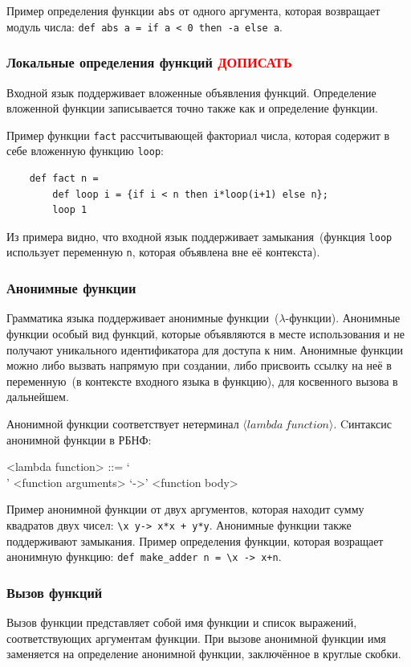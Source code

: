 \documentclass[12pt,a4paper,oneside]{extarticle}
\begin{document}
            Пример определения функции \lstinline$abs$ от одного аргумента, которая возвращает модуль числа: \lstinline$def abs a = if a < 0 then -a else a$.
        \subsubsection{Локальные определения функций \textcolor{red}{ДОПИСАТЬ}}
            Входной язык поддерживает вложенные объявления функций.
            Определение вложенной функции записывается точно также как и определение функции. 

            Пример функции \lstinline$fact$ рассчитывающей факториал числа, которая содержит в себе вложенную функцию \lstinline$loop$:
            \begin{lstlisting}
    def fact n = 
        def loop i = {if i < n then i*loop(i+1) else n};
        loop 1
            \end{lstlisting}
            Из примера видно, что входной язык поддерживает замыкания~(функция \lstinline$loop$ использует переменную \lstinline$n$, которая объявлена вне её контекста).

        \subsubsection{Анонимные функции}
            Грамматика языка поддерживает анонимные функции~($\lambda$-функции). Анонимные функции особый вид функций, которые объявляются в месте использования и не получают уникального идентификатора для доступа к ним. Анонимные функции можно либо вызвать напрямую при создании, либо присвоить ссылку на неё в переменную~(в контексте входного языка в функцию), для косвенного вызова в дальнейшем.

            Анонимной функции соответствует нетерминал $\langle lambda~function \rangle$. Cинтаксис анонимной функции в РБНФ:
            \begin{grammar}
                <lambda function> ::= `\\' <function arguments> `->' <function body>
            \end{grammar}

            Пример анонимной функции от двух аргументов, которая находит сумму квадратов двух чисел: \lstinline$\x y-> x*x + y*y$. 
            Анонимные функции также поддерживают замыкания. Пример определения функции, которая возращает анонимную функцию: \lstinline$def make_adder n = \x -> x+n$.

        \subsubsection{Вызов функций}
            Вызов функции представляет собой имя функции и список выражений, соответствующих аргументам функции.
            При вызове анонимной функции имя заменяется на определение анонимной функции, заключённое в круглые скобки.
\end{document}
